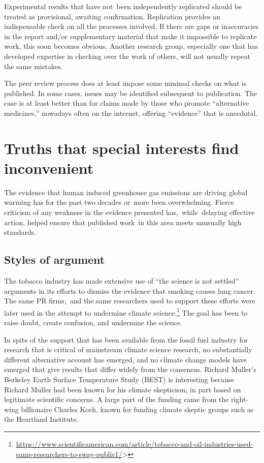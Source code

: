 \documentclass[
  10pt,
  b5paper]{book}
\begin{document}
Experimental results that have not~been independently
replicated should be treated as provisional, awaiting
confirmation. Replication provides an indispensable
check on all the processes involved. If there are gaps
or inaccuracies in the report and/or supplementary
material that make it impossible to replicate work,
this soon becomes obvious. Another research group,
especially one that has developed expertise in
checking over the work of others, will not usually
repeat the same mistakes.

The peer review process does at least impose some minimal
checks on what is published. In some cases, issues
may be identified subsequent to publication. The case is
at least better than for claims made by those who promote
``alternative medicines,'' nowadays often on the internet,
offering ``evidence'' that is anecdotal.

\hypertarget{truths-that-special-interests-find-inconvenient}{%
\section{Truths that special interests find inconvenient}\label{truths-that-special-interests-find-inconvenient}}

The evidence that human induced greenhouse gas emissions
are driving global warming has for the past two decades
or~more been overwhelming. Fierce criticism of any weakness
in the evidence presented has,~while~delaying effective
action, helped ensure that published work~in this area meets
unusually high standards.

\hypertarget{styles-of-argument}{%
\subsection*{Styles of argument}\label{styles-of-argument}}

The tobacco industry has made extensive use of ``the science is
not settled'' arguments in its efforts to dismiss the evidence
that smoking causes lung cancer. The same PR firms,~and the same
researchers used to support these efforts were later used in the
attempt to undermine climate
science.\footnote{\url{https://www.scientificamerican.com/article/tobacco-and-oil-industries-used-same-researchers-to-sway-public1/}\textgreater{}}
The goal has been to raise doubt, create confusion, and undermine
the science.

In spite of the support that has been available from the fossil
fuel industry for research that is critical of mainstream climate
science research, no substantially different alternative account
has emerged, and no climate change models have emerged that give
results that differ widely from the consensus. Richard Muller's
Berkeley Earth Surface Temperature Study (BEST) is interesting
because Richard Muller had been known for his climate skepticism,
in part based on legitimate scientific concerns. A large part of
the funding came from the right-wing billionaire Charles Koch,
known for funding climate skeptic groups such as the Heartland
Institute.
\end{document}
